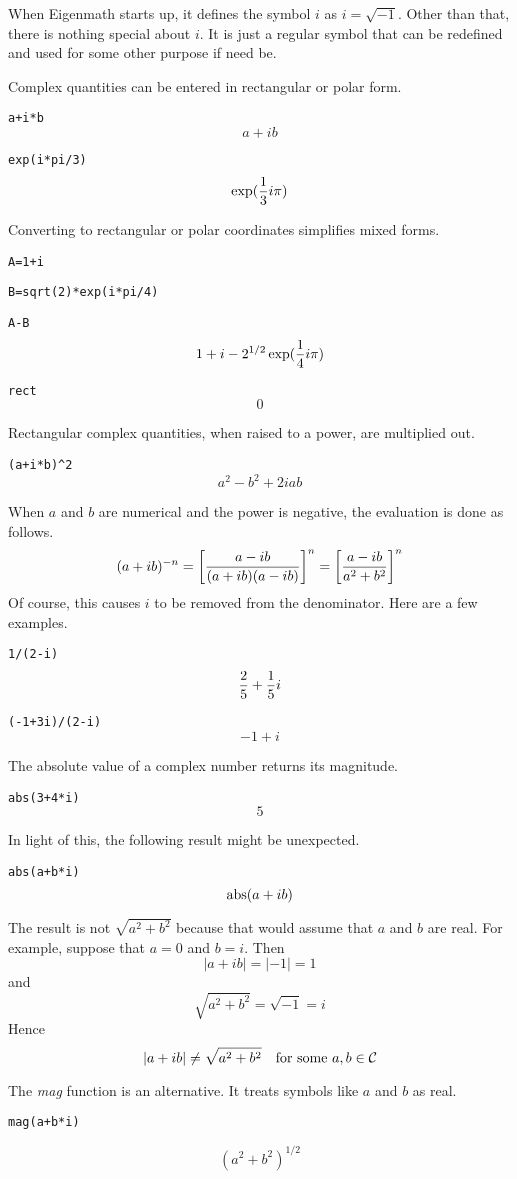 
\newpage


\noindent
When Eigenmath starts up, it defines the symbol $i$ as $i=\sqrt{-1}$.
Other than that, there is nothing special about $i$.
It is just a regular symbol that can be redefined and used for some other purpose if need be.

\medskip
\noindent
Complex quantities can be entered in rectangular or polar form.

\medskip
\verb$a+i*b$
$$a+ib$$

\verb$exp(i*pi/3)$
$$\exp({1\over3}i\pi)$$

\medskip
\noindent
Converting to rectangular or polar coordinates simplifies mixed forms.

\medskip
\verb$A=1+i$

\verb$B=sqrt(2)*exp(i*pi/4)$

\verb$A-B$
$$1+i-2^{1/2}\exp({1\over4}i\pi)$$

\verb$rect$
$$0$$

\medskip
\noindent
Rectangular complex quantities, when raised to a power, are multiplied out.

\medskip
\verb$(a+i*b)^2$
$$a^2-b^2+2iab$$

\medskip
\noindent
When $a$ and $b$ are numerical and the power is negative, the evaluation is done as follows.
$$(a+ib)^{-n}=\left[{a-ib\over(a+ib)(a-ib)}\right]^n=\left[{a-ib\over a^2+b^2}\right]^n$$
Of course, this causes $i$ to be removed from the denominator.
Here are a few examples.

\medskip
\verb$1/(2-i)$
$${2\over5}+{1\over5}i$$

\verb$(-1+3i)/(2-i)$
$$-1+i$$

\medskip
\noindent
The absolute value of a complex number returns its magnitude.

\medskip
\verb$abs(3+4*i)$
$$5$$

\medskip
\noindent
In light of this, the following result might be unexpected.

\medskip
\verb$abs(a+b*i)$
$$\mathop{\rm abs}(a+ib)$$

\medskip
\noindent
The result is not $\sqrt{a^2+b^2}$ because that would assume that
$a$ and $b$ are real.
For example, suppose that $a=0$ and $b=i$.
Then
$$|a+ib|=|-1|=1$$
and
$$\sqrt{a^2+b^2}=\sqrt{-1}=i$$
Hence
$$|a+ib|\ne\sqrt{a^2+b^2}\quad\hbox{for some $a,b\in\cal C$}$$

\medskip
\noindent
The {\it mag} function is an alternative.
It treats symbols like $a$ and $b$ as real.

\medskip
\verb$mag(a+b*i)$

$$(a^2+b^2)^{1/2}$$


